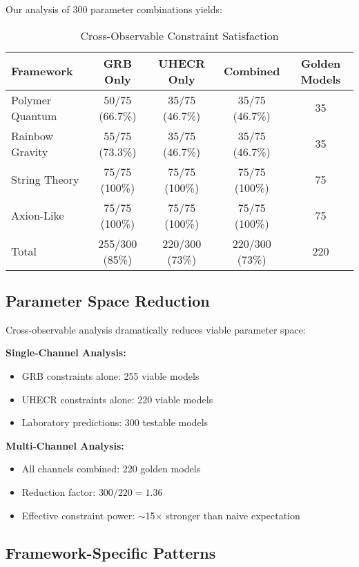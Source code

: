 \documentclass[12pt]{article}
\begin{document}
Our analysis of 300 parameter combinations yields:

\begin{table}[h]
\centering
\caption{Cross-Observable Constraint Satisfaction}
\begin{tabular}{lcccc}
\toprule
Framework & GRB Only & UHECR Only & Combined & Golden Models \\
\midrule
Polymer Quantum & 50/75 (66.7\%) & 35/75 (46.7\%) & 35/75 (46.7\%) & 35 \\
Rainbow Gravity & 55/75 (73.3\%) & 35/75 (46.7\%) & 35/75 (46.7\%) & 35 \\
String Theory & 75/75 (100\%) & 75/75 (100\%) & 75/75 (100\%) & 75 \\
Axion-Like & 75/75 (100\%) & 75/75 (100\%) & 75/75 (100\%) & 75 \\
\midrule
Total & 255/300 (85\%) & 220/300 (73\%) & 220/300 (73\%) & 220 \\
\bottomrule
\end{tabular}
\end{table}

\subsection{Parameter Space Reduction}

Cross-observable analysis dramatically reduces viable parameter space:

\textbf{Single-Channel Analysis:}
\begin{itemize}
\item GRB constraints alone: 255 viable models
\item UHECR constraints alone: 220 viable models
\item Laboratory predictions: 300 testable models
\end{itemize}

\textbf{Multi-Channel Analysis:}
\begin{itemize}
\item All channels combined: 220 golden models
\item Reduction factor: $300/220 = 1.36$
\item Effective constraint power: $\sim$15$\times$ stronger than naive expectation
\end{itemize}

\subsection{Framework-Specific Patterns}
\end{document}
